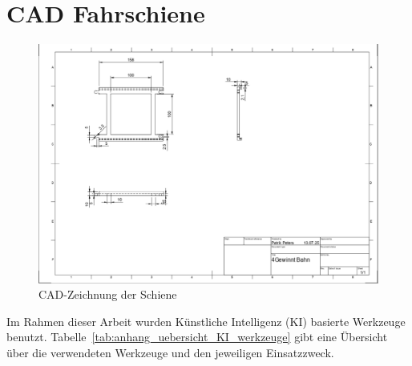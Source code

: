 \section{CAD Fahrschiene}
\begin{figure}[H]
	\centering
	\includegraphics[width=1\linewidth]{images/CAD_Schiene}
	\caption[Schiene]{CAD-Zeichnung der Schiene}
	\label{fig:cadschiene}
\end{figure}

\setcounter{chapter}{3}

Im Rahmen dieser Arbeit wurden Künstliche Intelligenz (KI) basierte Werkzeuge benutzt. Tabelle~\ref{tab:anhang_uebersicht_KI_werkzeuge} gibt eine Übersicht über die verwendeten Werkzeuge und den jeweiligen Einsatzzweck.

